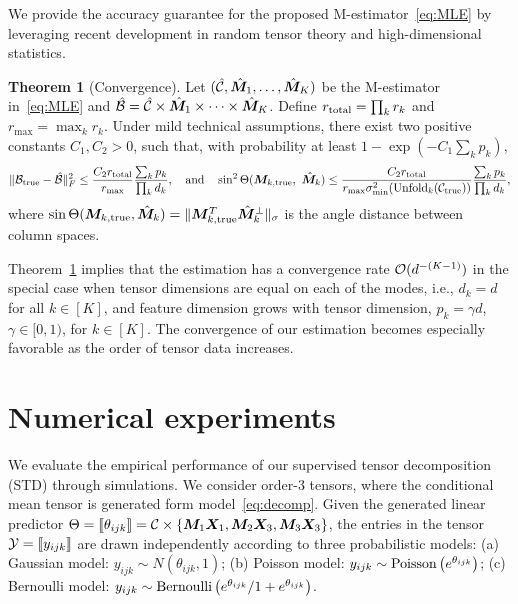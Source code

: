\documentclass{article}
\theoremstyle{definition}
\newtheorem{thm}{Theorem}[section]
\theoremstyle{definition}
\begin{document}
We provide the accuracy guarantee for the proposed M-estimator~\eqref{eq:MLE} by leveraging recent development in random tensor theory and high-dimensional statistics.
\begin{thm}[Convergence]\label{thm:main}
Let $(\hat {\mathcal{C}}, \hat {\bm M}_1,\ldots,\hat {\bm M}_K)$ be the M-estimator in~\eqref{eq:MLE} and $\hat {\mathcal{B}}=\hat {\mathcal{C}}\times \hat {\bm M}_1\times\cdots \times \hat {\bm M}_K$. Define $r_\textup{total}=\prod_k r_k$ and $r_{\max}=\max_k r_k$. Under mild technical assumptions, there exist two positive constants $C_1, C_2>0$, such that, with probability at least $1-\exp(-C_1\sum_k p_k)$, 
\begin{equation}\label{eq:bound}
    \lVert\mathcal{B}_{\textup{true}}- \hat {\mathcal{B}}\rVert_F^2\leq \frac{ C_{2} r_{\textup{total}}}{r_{\max}}\frac{\sum_k p_k}{\prod_k d_k},\quad \text{and}\quad
\sin^2 \Theta(\bm M_{k,\textup{true}},\ \hat {\bm M}_k) \leq  \frac{ C_{2}r_{\textup{total}}}{ r_{\max}\sigma^2_{\min}(\textup{Unfold}_k(\mathcal{C}_\textup{true}))}\frac{\sum_k p_k}{\prod_k d_k},
\end{equation}
where $\sin \Theta(\bm M_{k,\textup{true}},\hat {\bm M}_k)=\lVert\bm M_{k,\textup{true}}^T \hat {\bm M}_k^{\perp}\rVert_\sigma$ is the angle distance between column spaces. 
\end{thm}
Theorem~\ref{thm:main} implies that the estimation has a convergence rate $\mathcal{O}(d^{-(K-1)})$ in the special case when tensor dimensions are equal on each of the modes, i.e., $d_k=d$ for all $k\in[K]$, and feature dimension grows with tensor dimension, $p_k=\gamma d$, $\gamma\in [0,1)$, for $k\in[K]$. The convergence of our estimation becomes especially favorable as the order of tensor data increases. 

\section{Numerical experiments}

We evaluate the empirical performance of our supervised tensor decomposition (STD) through simulations. We consider order-3 tensors, where the conditional mean tensor is generated form model~\eqref{eq:decomp}.
 Given the generated linear predictor $\Theta=\llbracket \theta_{ijk} \rrbracket = \mathcal{C}\times\{\bm M_1\bm X_1,\bm M_2\bm X_3,\bm M_3\bm X_3\}$, the entries in the tensor $\mathcal{Y}=\llbracket y_{ijk} \rrbracket$ are drawn independently according to three probabilistic models: (a)  Gaussian model: $y_{ijk}\sim N\left( \theta_{ijk}, 1\right)$; (b)  Poisson model: $y_{ijk}\sim\textup{Poisson}\left( e^{ \theta_{ijk}}\right)$; (c) Bernoulli model:  $y_{ijk}\sim \textup{Bernoulli}\left( {e^{\theta_{ijk}}}/{1+e^{\theta_{ijk}}}\right)$.
\end{document}
